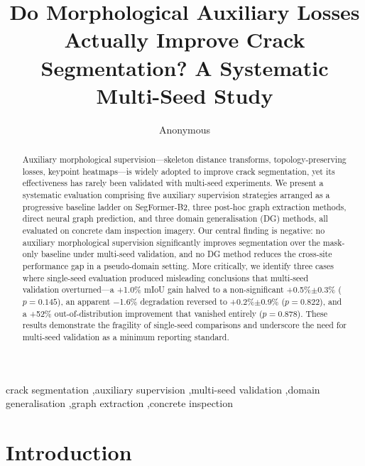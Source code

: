 \documentclass[preprint,12pt]{elsarticle}
\begin{document}
\begin{frontmatter}

\title{Do Morphological Auxiliary Losses Actually Improve Crack Segmentation? A Systematic Multi-Seed Study}

\author[anon]{Anonymous}
\address[anon]{Removed for double-blind review}

\begin{abstract}
Auxiliary morphological supervision---skeleton distance transforms, topology-preserving losses, keypoint heatmaps---is widely adopted to improve crack segmentation, yet its effectiveness has rarely been validated with multi-seed experiments. We present a systematic evaluation comprising five auxiliary supervision strategies arranged as a progressive baseline ladder on SegFormer-B2, three post-hoc graph extraction methods, direct neural graph prediction, and three domain generalisation (DG) methods, all evaluated on concrete dam inspection imagery. Our central finding is negative: no auxiliary morphological supervision significantly improves segmentation over the mask-only baseline under multi-seed validation, and no DG method reduces the cross-site performance gap in a pseudo-domain setting. More critically, we identify three cases where single-seed evaluation produced misleading conclusions that multi-seed validation overturned---a +1.0\% mIoU gain halved to a non-significant +0.5\%$\pm$0.3\% ($p{=}0.145$), an apparent $-$1.6\% degradation reversed to +0.2\%$\pm$0.9\% ($p{=}0.822$), and a +52\% out-of-distribution improvement that vanished entirely ($p{=}0.878$). These results demonstrate the fragility of single-seed comparisons and underscore the need for multi-seed validation as a minimum reporting standard.
\end{abstract}

\begin{keyword}
crack segmentation \sep auxiliary supervision \sep multi-seed validation \sep domain generalisation \sep graph extraction \sep concrete inspection
\end{keyword}

\end{frontmatter}



\section{Introduction}
\label{sec:introduction}
\end{document}
